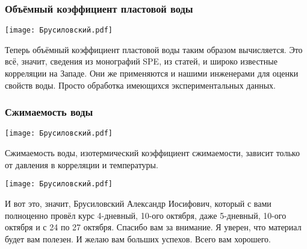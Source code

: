 \documentclass[main.tex]{subfiles}
\begin{document}
\subsubsection{Объёмный коэффициент пластовой воды}

\begin{center}
\texttt{[image: Брусиловский.pdf]}
\end{center}

Теперь объёмный коэффициент пластовой воды таким образом вычисляется.
Это всё, значит, сведения из монографий SPE, из статей, и широко известные корреляции на Западе.
Они же применяются и нашими инженерами для оценки свойств воды.
Просто обработка имеющихся экспериментальных данных.

\subsubsection{Сжимаемость воды}

\begin{center}
\texttt{[image: Брусиловский.pdf]}
\end{center}

Сжимаемость воды, изотермический коэффициент сжимаемости, зависит только от давления в корреляции и температуры.

\begin{center}
\texttt{[image: Брусиловский.pdf]}
\end{center}

И вот это, значит, Брусиловский Александр Иосифович, который с вами полноценно провёл курс 4-дневный, 10-ого октября, даже 5-дневный, 10-ого октября и с 24 по 27 октября.
Спасибо вам за внимание. Я уверен, что материал будет вам полезен.
И желаю вам больших успехов. Всего вам хорошего.
\end{document}
